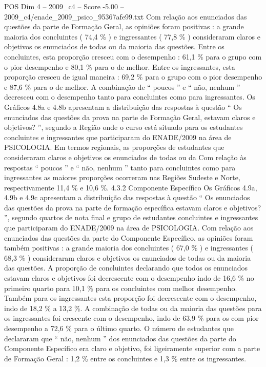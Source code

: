 \begin{textsample}{POS Dim 4 – 2009\_c4 – Score -5.00 – 2009\_c4/enade\_2009\_psico\_95367afe99.txt}
Com relação aos enunciados das questões da parte de Formação Geral, as opiniões foram positivas : a grande maioria dos concluintes ( 74,4 \% ) e ingressantes ( 77,8 \% ) consideraram claros e objetivos os enunciados de todas ou da maioria das questões.
Entre os concluintes, esta proporção cresceu com o desempenho : 61,1 \% para o grupo com o pior desempenho e 80,1 \% para o de melhor.
Entre os ingressantes, esta proporção cresceu de igual maneira : 69,2 \% para o grupo com o pior desempenho e 87,6 \% para o de melhor.
A combinação de “ poucos ” e “ não, nenhum ” decresceu com o desempenho tanto para concluintes como para ingressantes.
Os Gráficos 4.8a e 4.8b apresentam a distribuição das respostas à questão “ Os enunciados das questões da prova na parte de Formação Geral, estavam claros e objetivos? ”, segundo a Região onde o curso está situado para os estudantes concluintes e ingressantes que participaram do ENADE/2009 na área de PSICOLOGIA.
Em termos regionais, as proporções de estudantes que consideraram claros e objetivos os enunciados de todas ou da Com relação às respostas “ poucos ” e “ não, nenhum ” tanto para concluintes como para ingressantes as maiores proporções ocorreram nas Regiões Sudeste e Norte, respectivamente 11,4 \% e 10,6 \%. 4.3.2 Componente Específico Os Gráficos 4.9a, 4.9b e 4.9c apresentam a distribuição das respostas à questão “ Os enunciados das questões da prova na parte de formação específica estavam claros e objetivos? ”, segundo quartos de nota final e grupo de estudantes concluintes e ingressantes que participaram do ENADE/2009 na área de PSICOLOGIA.
Com relação aos enunciados das questões da parte do Componente Específico, as opiniões foram também positivas : a grande maioria dos concluintes ( 67,0 \% ) e ingressantes ( 68,3 \% ) consideraram claros e objetivos os enunciados de todas ou da maioria das questões.
A proporção de concluintes declarando que todos os enunciados estavam claros e objetivos foi decrescente com o desempenho indo de 16,6 \% no primeiro quarto para 10,1 \% para os concluintes com melhor desempenho.
Também para os ingressantes esta proporção foi decrescente com o desempenho, indo de 18,2 \% a 13,2 \%.
A combinação de todas ou da maioria das questões para os ingressantes foi crescente com o desempenho, indo de 63,9 \% para os com pior desempenho a 72,6 \% para o último quarto.
O número de estudantes que declararam que “ não, nenhum ” dos enunciados das questões da parte do Componente Específico era claro e objetivo, foi ligeiramente superior com a parte de Formação Geral : 1,2 \% entre os concluintes e 1,3 \% entre os ingressantes.

\end{textsample}
